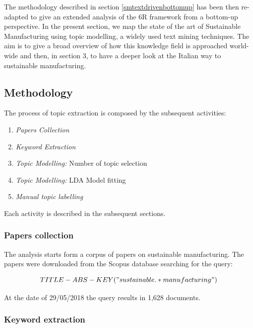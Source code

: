 \documentclass[]{book}
\providecommand{\tightlist}{%
  \setlength{\itemsep}{0pt}\setlength{\parskip}{0pt}}
\theoremstyle{definition}
\theoremstyle{definition}
\theoremstyle{definition}
\theoremstyle{remark}
\begin{document}
The methodology described in section \ref{smtextdrivenbottomup} has been
then re-adapted to give an extended analysis of the 6R framework from a
bottom-up perspective. In the present section, we map the state of the
art of Sustainable Manufacturing using topic modelling, a widely used
text mining techniques. The aim is to give a broad overview of how this
knowledge field is approached world-wide and then, in section 3, to have
a deeper look at the Italian way to sustainable manufacturing.

\subsection{Methodology}\label{methodology-3}

The process of topic extraction is composed by the subsequent
activities:

\begin{enumerate}
\def\labelenumi{\arabic{enumi}.}
\tightlist
\item
  \emph{Papers Collection}
\item
  \emph{Keyword Extraction}
\item
  \emph{Topic Modelling:} Number of topic selection
\item
  \emph{Topic Modelling:} LDA Model fitting
\item
  \emph{Manual topic labelling}
\end{enumerate}

Each activity is described in the subsequent sections.

\subsubsection*{Papers collection}\label{papers-collection}

The analysis starts form a corpus of papers on sustainable
manufacturing. The papers were downloaded from the Scopus database
searching for the query:

\begin{equation*} 
  TITLE-ABS-KEY("sustainable.*manufacturing")
\end{equation*}

At the date of 29/05/2018 the query results in 1,628 documents.

\subsubsection*{Keyword extraction}\label{keyword-extraction}
\end{document}
